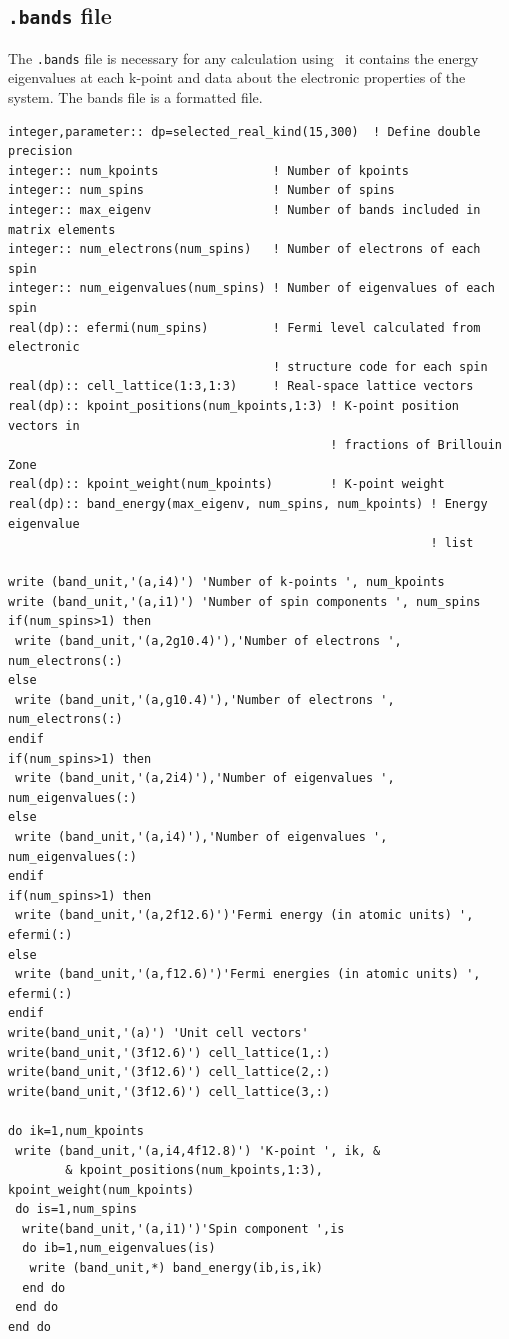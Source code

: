 \documentclass[a4paper,11pt,twoside]{book}
\begin{document}
{\begin{appendix}
\section{\texttt{.bands} file}
The \texttt{.bands} file is necessary for any calculation using \optados\ it contains the energy eigenvalues at each k-point and data about the electronic properties of the system.
%
The bands file is a formatted file.
\begin{verbatim}
integer,parameter:: dp=selected_real_kind(15,300)  ! Define double precision
integer:: num_kpoints                ! Number of kpoints
integer:: num_spins                  ! Number of spins
integer:: max_eigenv                 ! Number of bands included in matrix elements
integer:: num_electrons(num_spins)   ! Number of electrons of each spin
integer:: num_eigenvalues(num_spins) ! Number of eigenvalues of each spin
real(dp):: efermi(num_spins)         ! Fermi level calculated from electronic
                                     ! structure code for each spin
real(dp):: cell_lattice(1:3,1:3)     ! Real-space lattice vectors
real(dp):: kpoint_positions(num_kpoints,1:3) ! K-point position vectors in
                                             ! fractions of Brillouin Zone
real(dp):: kpoint_weight(num_kpoints)        ! K-point weight
real(dp):: band_energy(max_eigenv, num_spins, num_kpoints) ! Energy eigenvalue
                                                           ! list

write (band_unit,'(a,i4)') 'Number of k-points ', num_kpoints
write (band_unit,'(a,i1)') 'Number of spin components ', num_spins
if(num_spins>1) then
 write (band_unit,'(a,2g10.4)'),'Number of electrons ', num_electrons(:)
else
 write (band_unit,'(a,g10.4)'),'Number of electrons ', num_electrons(:)
endif
if(num_spins>1) then
 write (band_unit,'(a,2i4)'),'Number of eigenvalues ', num_eigenvalues(:)
else
 write (band_unit,'(a,i4)'),'Number of eigenvalues ', num_eigenvalues(:)
endif
if(num_spins>1) then
 write (band_unit,'(a,2f12.6)')'Fermi energy (in atomic units) ', efermi(:)
else
 write (band_unit,'(a,f12.6)')'Fermi energies (in atomic units) ', efermi(:)
endif
write(band_unit,'(a)') 'Unit cell vectors'
write(band_unit,'(3f12.6)') cell_lattice(1,:)
write(band_unit,'(3f12.6)') cell_lattice(2,:)
write(band_unit,'(3f12.6)') cell_lattice(3,:)

do ik=1,num_kpoints
 write (band_unit,'(a,i4,4f12.8)') 'K-point ', ik, &
        & kpoint_positions(num_kpoints,1:3), kpoint_weight(num_kpoints)
 do is=1,num_spins
  write(band_unit,'(a,i1)')'Spin component ',is
  do ib=1,num_eigenvalues(is)
   write (band_unit,*) band_energy(ib,is,ik)
  end do
 end do
end do
\end{verbatim}

\end{appendix}}
\end{document}
